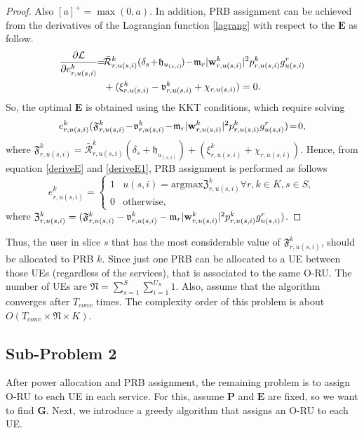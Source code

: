 \documentclass[lettersize,journal]{IEEEtran}
\begin{document}
\begin{proof}
Also $[a]^+ = \max(0,a)$.
In addition, PRB assignment can be achieved from the derivatives of the Lagrangian function \eqref{lagrang} with respect to the $\boldsymbol{E}$ as follow.
\begin{align}\label{deriveE}
\dfrac{\partial\mathcal{L}}{\partial e_{r,u(s,i)}^{k}} \!\!=\! &\mathcal{\bar{R}}_{r,u(s,i)}^{k}(\delta_s\!+\!\mathfrak{h}_{u_{(s,i)}}\!)\!-\! \mathfrak{m}_{r}|\bold{w}_{r,u(s,i)}^{k}|^2 p_{r,u(s,i)}^{k} g_{u(s,i)}^r\nonumber\\
&+( \xi^{k}_{r,u(s,i)}-\mathfrak{v}^{k}_{r,u(s,i)} +\chi_{r,u(s,i)})=0.
\end{align}
So, the optimal $\boldsymbol{E}$ is obtained using the KKT conditions, which require solving
\begin{align}\label{deriveE1}
e_{r,u(s,i)}^{k}  (\mathfrak{F}^{k}_{r,u(s,i)} \!-\!\mathfrak{v}^{k}_{r,u(s,i)}\! -\! \mathfrak{m}_{r}|\bold{w}_{r,u(s,i)}^{k}|^2 p_{r,u(s,i)}^{k} g_{u(s,i)}^r )\! =\! 0,
\end{align}
where $\mathfrak{F}^{k}_{r,u(s,i)} =\mathcal{\bar{R}}_{r,u(s,i)}^{k}(\delta_s+\mathfrak{h}_{u_{(s,i)}})+( \xi^{k}_{r,u(s,i)} +\chi_{r,u(s,i)}) $.
Hence, from equation \eqref{deriveE} and \eqref{deriveE1}, PRB assignment is performed as follows
\begin{equation}
e_{r,u(s,i)}^{k} =
  \begin{cases}
      1 & u(s,i) = \text{argmax} \mathfrak{Z}^{k}_{r,u(s,i)} \forall r, k \in K, s \in S, \\
      0 & \text{otherwise,}
    \end{cases}
\end{equation}
where $\mathfrak{Z}^{k}_{r,u(s,i)} = (\mathfrak{F}^{k}_{r,u(s,i)} -\mathfrak{v}^{k}_{r,u(s,i)}- \mathfrak{m}_{r}|\bold{w}_{r,u(s,i)}^{k}|^2 p_{r,u(s,i)}^{k} g_{u(s,i)}^r )$.
 \end{proof}
Thus, the user in slice $s$ that has  the most considerable value of $\mathfrak{F}^{k}_{r,u(s,i)}$, should be allocated to PRB $k$. Since just one PRB can be allocated to a UE between those UEs (regardless of the services), that is associated to the same O-RU.
The number of UEs are $\mathfrak{N} = \sum_{s=1}^{S}\sum_{i=1}^{U_S}1$. Also, assume that the algorithm converges after $T_{conv}$ times.
The complexity order of this problem is about $O( T_{conv} \times\mathfrak{N} \times K)$.
\vspace{-3mm}
\subsection{Sub-Problem 2}\label{sub2}
\vspace{-1mm}
After power allocation and PRB assignment, the remaining problem is to assign O-RU to each UE in each service.
For this, assume $\boldsymbol{P}$ and $\boldsymbol{E}$ are fixed, so we want to find $\boldsymbol{G}$.
Next, we introduce a greedy algorithm that assigns an O-RU to each UE.
\end{document}
